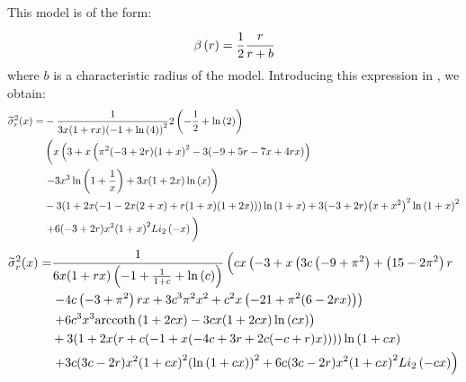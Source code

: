 This model is of the form:
%
\begin{equation}
    \beta \left(r\right) = \frac{1}{2}\cfrac{r}{r+b}
\end{equation}
%
where $b$ is a characteristic radius of the model. Introducing this
expression in , we obtain:
%
\begin{align}
    \widetilde\sigma_r^2(x)=&
        -\frac{1}{3 x (1+r x)
        {(-1+\ln\left(4\right))}^2}2
        \left(-\frac{1}{2}+\ln\left(2\right)\right)\nonumber\\
    &\left(x \left(3+x \left(\pi ^2 (-3+2 r)
        {(1+x)}^2-3 (-9+5 r-7 x+4 r x)
        \right)\right.\vphantom{\ln\left(1+\frac{1}{x}\right)}\right.
        \nonumber\\
    &\left.-3 x^3 \ln\left(1+\frac{1}{x}\right)+3 x (1+2 x)
        \ln\left(x\right)\right)\nonumber\\
    & -3 (1+2 x (-1-2 x (2+x)+r (1+x) (1+2 x)))
        \ln\left(1+x\right)+3 (-3+2 r) {\left(x+x^2\right)}^2
        \ln{\left(1+x\right)}^2\nonumber\\
    & \left.+6 (-3+2 r) x^2 {(1+x)}^2
        Li_2\left(-x\right)\vphantom{\ln\left(1+\frac{1}{x}\right)}\right)
        \nonumber\\
\end{align}
\begin{align}
    \widetilde\sigma_r^2(x)=&
        \frac{1}{6 x (1+r x) \left(-1+\frac{1}{1+c}+\ln\left(c\right)\right)}
        \left(c x \left(-3+x \left(3 c \left(-9+\pi ^2\right)+
        \left(15-2 \pi ^2\right) r\right.\right.
        \vphantom{{(1+c x)}^2}\right.\\
    &\left. -4 c \left(-3+\pi ^2\right) r x+
        3 c^3 \pi ^2 x^2+c^2 x \left(-21+\pi ^2 (6-2 r x)\right)\right)\\
    & \left.+6 c^3 x^3 {\rm arccoth} \left(1+2 c x\right)-
        3 c x (1+2 c x) \ln\left(c x\right)\right)\\
    &+3(1+2 x (r+c (-1+x (-4 c+3 r+2 c (-c+r) x))))
        \ln\left(1+c x\right)\\
    &\left.+3c(3 c-2 r) x^2 {(1+c x)}^2 {\left(\ln\left(1+c x\right)\right)}^2+
        6 c (3 c-2 r) x^2 {(1+c x)}^2 Li_2\left(-c x\right)\right)\\
\end{align}
